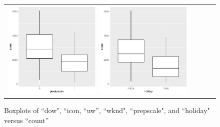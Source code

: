 \documentclass [11pt, proquest] {uwthesis}[2015/03/03]
\begin{document}
\begin{figure}
\begin{tabular}{ll}
\includegraphics[width=0.45\textwidth]{figures/scale_cat}
\includegraphics[width=0.45\textwidth]{figures/holiday_cat}\\
\end{tabular}
\vspace{-10pt}
\caption{Boxplots of ``dow", ``icon, ``uw'', ``wknd", ``prepscale", and ``holiday"  versus ``count''}
\label{fig:cat_bxplot}
\end{figure}

%
\end{document}
